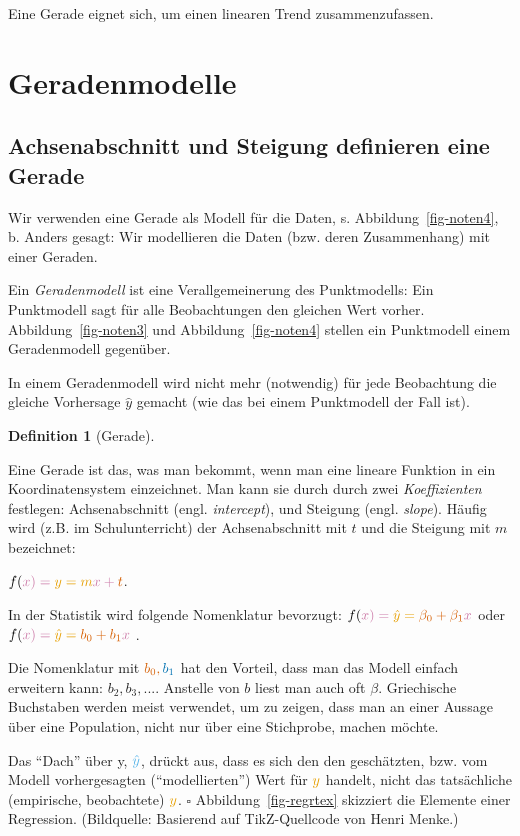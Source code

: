 \documentclass[
  letterpaper,
]{scrbook}
\theoremstyle{definition}
\theoremstyle{definition}
\theoremstyle{definition}
\newtheorem{definition}{Definition}[chapter]
\theoremstyle{remark}
\begin{document}
Eine Gerade eignet sich, um einen linearen Trend zusammenzufassen.

\section{Geradenmodelle}\label{geradenmodelle}

\subsection{Achsenabschnitt und Steigung definieren eine
Gerade}\label{achsenabschnitt-und-steigung-definieren-eine-gerade}

Wir verwenden eine Gerade als Modell für die Daten, s.
Abbildung~\ref{fig-noten4}, b. Anders gesagt: Wir modellieren die Daten
(bzw. deren Zusammenhang) mit einer Geraden.

Ein \emph{Geradenmodell} ist eine Verallgemeinerung des Punktmodells:
Ein Punktmodell sagt für alle Beobachtungen den gleichen Wert vorher.
Abbildung~\ref{fig-noten3} und Abbildung~\ref{fig-noten4} stellen ein
Punktmodell einem Geradenmodell gegenüber.

In einem Geradenmodell wird nicht mehr (notwendig) für jede Beobachtung
die gleiche Vorhersage \(\hat{y}\) gemacht (wie das bei einem
Punktmodell der Fall ist).

\begin{definition}[Gerade]\protect\hypertarget{def-gerade}{}\label{def-gerade}

Eine Gerade ist das, was man bekommt, wenn man eine lineare Funktion in
ein Koordinatensystem einzeichnet. Man kann sie durch durch zwei
\emph{Koeffizienten} festlegen: Achsenabschnitt (engl.
\emph{intercept}), und Steigung (engl. \emph{slope}). Häufig wird (z.B.
im Schulunterricht) der Achsenabschnitt mit \(t\) und die Steigung mit
\(m\) bezeichnet:

\(f(\color{xcol}{x})=\color{ycol}{y}={m} \color{xcol}{x} + \color{beta0col}{t}\).

In der Statistik wird folgende Nomenklatur bevorzugt:
\(f(\color{xcol}{x})=\color{ycol}{\hat{y}}=\color{beta0col}{\beta_0} + {\beta_1} \color{xcol}{x}\)
oder
\(f(\color{xcol}{x})=\color{ycol}{\hat{y}}= \color{beta0col}{b_0} + {b_1} \color{xcol}{x}\)
.

Die Nomenklatur mit \(\color{beta0col}{b_0}, \color{beta1col}{b_1}\) hat
den Vorteil, dass man das Modell einfach erweitern kann:
\(b_2, b_3, ...\). Anstelle von \(b\) liest man auch oft \(\beta\).
Griechische Buchstaben werden meist verwendet, um zu zeigen, dass man an
einer Aussage über eine Population, nicht nur über eine Stichprobe,
machen möchte.

Das \enquote{Dach} über y, \(\color{modelcol}{\hat{y}}\), drückt aus,
dass es sich den den geschätzten, bzw. vom Modell vorhergesagten
(\enquote{modellierten}) Wert für \(\color{ycol}{y}\) handelt, nicht das
tatsächliche (empirische, beobachtete) \(\color{ycol}{y}\). \(\square\)
Abbildung~\ref{fig-regrtex} skizziert die Elemente einer Regression.
(Bildquelle: Basierend auf TikZ-Quellcode von Henri Menke.)

\end{definition}
\end{document}
